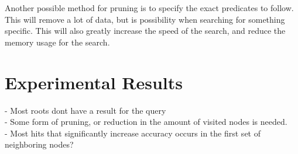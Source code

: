 Another possible method for pruning is to specify the exact predicates to follow. This will remove a lot of data, but is possibility when searching for something specific. This will also greatly increase the speed of the search, and reduce the memory usage for the search. 


\section{Experimental Results}
\label{sec:experimentalResults}

- Most roots dont have a result for the query\\
- Some form of pruning, or reduction in the amount of visited nodes is needed.\\
- Most hits that significantly increase accuracy occurs in the first set of neighboring nodes?\\

